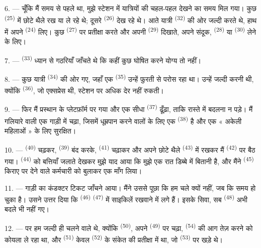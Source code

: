 6. --- चूँकि मैं समय से पहले था, मुझे स्टेशन में यात्रियों की चहल-पहल देखने का
समय मिल गया। कुछ  \textsuperscript{(25)} में छोटे थैले रख या ले
रहे थे; दूसरे  \textsuperscript{(26)} देख रहे थे। आते यात्री
 \textsuperscript{(32)} की ओर जल्दी करते थे, हाथ में अपने
 \textsuperscript{(24)} लिए। कुछ 
\textsuperscript{(27)} पर प्रतीक्षा करते और अपनी 
\textsuperscript{(29)} दिखाते, अपने संदूक, 
\textsuperscript{(28)} या  \textsuperscript{(30)} लेने के
लिए।

7. ---  \textsuperscript{(33)} ध्यान से गठरियाँ जाँचते
थे कि कहीं कुछ घोषित करने योग्य तो नहीं।

8. --- कुछ यात्री  \textsuperscript{(34)} की ओर गए, जहाँ एक
 \textsuperscript{(35)} उन्हें फुरती से परोस रहा था। उन्हें जल्दी
करनी थी, क्योंकि  \textsuperscript{(36)}, जो एक्सप्रेस थी, स्टेशन
पर अधिक देर नहीं रुकती।

9. --- फिर मैं प्रस्थान के प्लेटफ़ॉर्म पर गया और एक सीधा 
\textsuperscript{(37)} ढूँढ़ा, ताकि रास्ते में बदलना न पड़े। मैं गलियारे वाली एक
गाड़ी में चढ़ा, जिसमें धूम्रपान करने वालों के लिए एक 
\textsuperscript{(38)} है और एक « अकेली महिलाओं » के लिए सुरक्षित।

\VUsaut{3.0mm}

10. ---  \textsuperscript{(40)} चढ़कर, 
\textsuperscript{(39)} बंद करके,  \textsuperscript{(41)} चढ़ाकर और अपने
छोटे थैले  \textsuperscript{(43)} में रखकर मैं
 \textsuperscript{(42)} पर बैठ गया। 
\textsuperscript{(44)} को बत्तियाँ जलाते देखकर मुझे याद आया कि मुझे एक रात डिब्बे
में बितानी है, और मैंने  \textsuperscript{(45)} किराए पर देने वाले
कर्मचारी को बुलाकर एक माँग लिया।

11. --- गाड़ी का कंडक्टर टिकट जाँचने आया। मैंने उससे पूछा कि हम चले क्यों नहीं,
जब कि समय हो चुका है। उसने उत्तर दिया कि 
\textsuperscript{(46)}  \textsuperscript{(47)} में
साइकिलें रखवाने में लगे हैं। इसके सिवा, सब 
\textsuperscript{(48)} अभी बदले भी नहीं गए।

12. --- पर हम जल्दी ही चलने वाले थे, क्योंकि 
\textsuperscript{(50)}, अपने  \textsuperscript{(49)} पर चढ़ा,
 \textsuperscript{(54)} की आग तेज़ करने को कोयला ले रहा था, और
 \textsuperscript{(51)} केवल 
\textsuperscript{(52)} के संकेत की प्रतीक्षा में था, जो 
\textsuperscript{(53)} पर खड़े थे।

